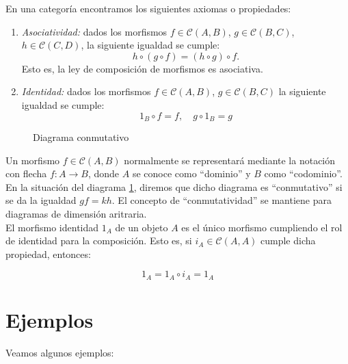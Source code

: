 En una categoría encontramos los siguientes axiomas o propiedades:

\begin{enumerate}
    \item \textit{Asociatividad: } dados los morfismos $f \in \mathscr{C}(A,B)$, $g \in \mathscr{C}(B,C)$, $h \in \mathscr{C}(C,D)$, la siguiente igualdad se cumple:
        \begin{equation}
            h \circ (g \circ f) = (h \circ g) \circ f.
        \end{equation}
    Esto es, la ley de composición de morfismos es asociativa.    
    \item \textit{Identidad: } dados los morfismos $f \in \mathscr{C}(A,B)$, $g \in \mathscr{C}(B,C)$ la siguiente igualdad se cumple: 
        \begin{equation}
            1_{B} \circ f = f, \quad g \circ 1_{B} = g 
        \end{equation}
\end{enumerate}

\begin{figure}[htpb] %
    \centering
    \caption{Diagrama conmutativo}
    \label{diag:diagrama-basico}
\end{figure}

Un morfismo $f \in \mathscr{C}(A,B)$ normalmente se representará mediante la notación con flecha $f: A \longrightarrow B$, donde $A$ se conoce como ``dominio'' y $B$ como ``codominio''.
En la situación del diagrama \ref{diag:diagrama-basico}, diremos que dicho diagrama es ``conmutativo'' si se da la igualdad $gf = kh$. El concepto de ``conmutatividad'' se mantiene para diagramas de dimensión aritraria. \\
El morfismo identidad $1_{A}$ de un objeto $A$ es el único morfismo cumpliendo el rol de identidad para la composición. Esto es, si $i_{A} \in \mathscr{C}(A,A)$ cumple dicha propiedad, entonces:

\begin{equation}
    1_{A} = 1_{A} \circ i_{A} = 1_{A}
\end{equation}

\section{Ejemplos}
Veamos algunos ejemplos:

